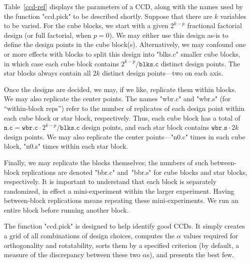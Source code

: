 \documentclass[article,nojss]{jss}
\begin{document}
Table~\ref{ccd-ref} displays the parameters of a CCD, along with the names used by the function "ccd.pick" to be described shortly.  Suppose that there are $k$ variables to be varied.  For the cube blocks, we start with a given $2^{k-p}$ fractional factorial design (or full factorial, when $p=0$).  We may either use this design as-is to define the design points in the cube block(s).  Alternatively, we may confound one or more effects with blocks to split this design into "blks.c" smaller cube blocks, in which case each cube block contains $2^{k-p}/\mathtt{blks.c}$ distinct design points.  The star blocks always contain all $2k$ distinct design points---two on each axis.

Once the designs are decided, we may, if we like, replicate them within blocks.  We may also replicate the center points.  The names "wbr.c" and "wbr.s" (for ``within-block reps'') refer to the number of replicates of each design point within each cube block or star block, respectively.  
Thus, each cube block has a total of $\mathtt{n.c} = \mathtt{wbr.c}\cdot2^{k-p}/\mathtt{blks.c}$ design points, and each star block contains $\mathtt{wbr.s}\cdot2k$ design points.
We may also replicate the center points---"n0.c" times in each cube block, "n0.s" times within each star block.

Finally, we may replicate the blocks themselves; the numbers of such between-block replications are denoted "bbr.c" and~"bbr.s" for cube blocks and star blocks, respectively.  It is important to understand that each block is separately randomized, in effect a mini-experiment within the larger experiment.  Having between-block replications means repeating these mini-experiments.  We run an entire block before running another block. 

The function "ccd.pick" is designed to help identify good CCDs.  It simply creates a grid of all combinations of design choices, computes the $\alpha$ values required for orthogonality and rotatability, sorts them by a specified criterion (by default, a measure of the discrepancy between these two $\alpha$s), and presents the best few.  
\end{document}

